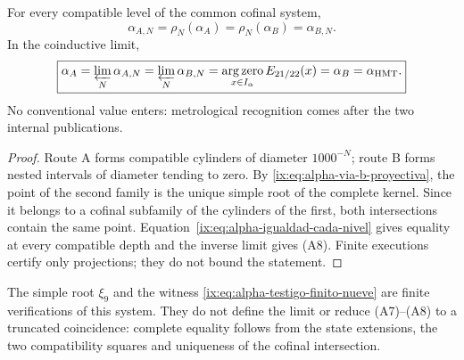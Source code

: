 \begin{theorem}
\label{ix:prop:alpha-dos-limites-historico-rev04}
For every compatible level of the common cofinal system,
\begingroup
\renewcommand{\theequation}{A7}
\begin{equation}
 \boxed{\alpha_{A,N}=\rho_N(\alpha_A)
 =\rho_N(\alpha_B)=\alpha_{B,N}.}
 \label{ix:eq:alpha-dos-vias-cada-nivel-historico-rev04}
\end{equation}
\endgroup
In the coinductive limit,
\begingroup
\renewcommand{\theequation}{A8}
\begin{equation}
 \boxed{\alpha_A
 =\varprojlim_N\alpha_{A,N}
 =\varprojlim_N\alpha_{B,N}
 =\operatorname*{arg\,zero}_{x\in I_\alpha}E_{21/22}(x)
 =\alpha_B=\alpha_{\mathrm{HMT}}.}
 \label{ix:eq:alpha-dos-vias-limite-coinductivo-historico-rev04}
\end{equation}
\endgroup
No conventional value enters: metrological recognition comes
after the two internal publications.
\end{theorem}

\begin{proof}
Route A forms compatible cylinders of diameter \(1000^{-N}\); route B forms
nested intervals of diameter tending to zero. By
\eqref{ix:eq:alpha-via-b-proyectiva}, the point of the second family is the unique
simple root of the complete kernel. Since it belongs to a cofinal subfamily
of the cylinders of the first, both intersections contain the same point.
Equation~\eqref{ix:eq:alpha-igualdad-cada-nivel} gives equality at every
compatible depth and the inverse limit gives (A8). Finite executions
certify only projections; they do not bound the statement.
\end{proof}

The simple root \(\xi_9\) and the witness
\eqref{ix:eq:alpha-testigo-finito-nueve} are finite verifications of this
system. They do not define the limit or reduce (A7)--(A8) to a truncated
coincidence: complete equality follows from the state extensions, the
two compatibility squares and uniqueness of the cofinal intersection.
